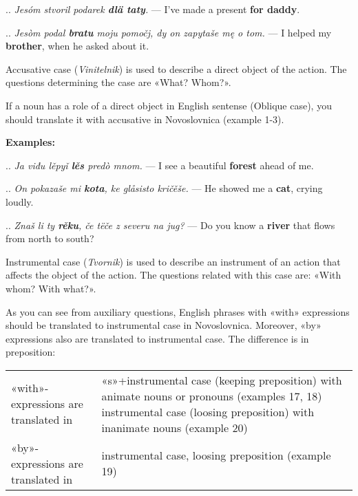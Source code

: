 .. \textit{Jesóm stvoril podarek \textbf{dlä taty}.} — I've made a present \textbf{for daddy}.

.. \textit{Jesòm podal \textbf{bratu} moju pomočj, dy on zapytaše mę o tom.} — I helped my \textbf{brother}, when he asked about it.

Accusative case (\textit{Vinitelnik}) is used to describe a direct object of the action. The questions determining the case are «What? Whom?».

If a noun has a role of a direct object in English sentense (Oblique case), you should translate it with accusative in Novoslovnica (example 1-3).

\textbf{Examples:}

.. \textit{Ja viđu lěpyǐ \textbf{lěs} predò mnom.} — I see a beautiful \textbf{forest} ahead of me.

.. \textit{On pokazaše mi \textbf{kota}, ke glåsisto kričěše.} — He showed me a \textbf{cat}, crying loudly.

.. \textit{Znaš li ty \textbf{rěku}, če tëče z severu na jug?} — Do you know a \textbf{river} that flows from north to south?

Instrumental case (\textit{Tvornik}) is used to describe an instrument of an action that affects the object of the action. The questions related with this case are: «With whom? With what?».

As you can see from auxiliary questions, English phrases with «with» expressions should be translated to instrumental case in Novoslovnica. Moreover, «by» expressions also are translated to instrumental case. The difference is in preposition:

\begin{table}
	\begin{tabular}{p{9em}p{9em}}
		«with»-expressions are translated in & «s»+instrumental case (keeping preposition) with animate nouns or pronouns (examples 17, 18)
		instrumental case (loosing preposition) with inanimate nouns (example 20) \\
		«by»-expressions are translated in &  instrumental case, loosing preposition (example 19) \\
	\end{tabular}
\end{table}

